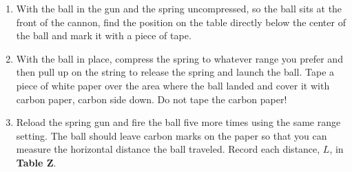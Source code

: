 \documentclass[addpoints]{physlabs}
\begin{document}
\begin{labsection}
\begin{experiment}
\begin{enumerate}
        \item With the ball in the gun and the spring uncompressed, so the ball sits at the front of the cannon, find the position on the table directly below the center of the ball and mark it with a piece of tape.

        \item With the ball in place, compress the spring to whatever range you prefer and then pull up on the string to release the spring and launch the ball. Tape a piece of white paper over the area where the ball landed and cover it with carbon paper, carbon side down. Do not tape the carbon paper!

        \item Reload the spring gun and fire the ball five more times using the same range setting. The ball should leave carbon marks on the paper so that you can measure the horizontal distance the ball traveled. Record each distance, $L$, in \textbf{Table Z}.
    \end{enumerate}
    
\end{experiment}

\end{labsection}
\end{document}
